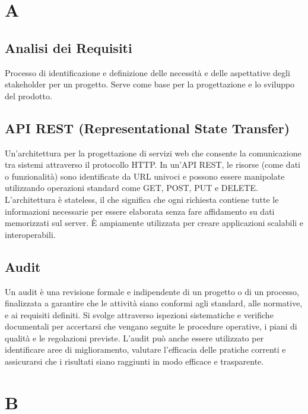 \documentclass{article}
\begin{document}


\section{A}

\subsection{Analisi dei Requisiti}
Processo di identificazione e definizione delle necessità e delle aspettative degli stakeholder per un progetto. Serve come base per la progettazione e lo sviluppo del prodotto.

\subsection{API REST (Representational State Transfer)}
Un'architettura per la progettazione di servizi web che consente la comunicazione tra sistemi attraverso il protocollo HTTP. In un'API REST, le risorse (come dati o funzionalità) sono identificate da URL univoci e possono essere manipolate utilizzando operazioni standard come GET, POST, PUT e DELETE. L'architettura è stateless, il che significa che ogni richiesta contiene tutte le informazioni necessarie per essere elaborata senza fare affidamento su dati memorizzati sul server. È ampiamente utilizzata per creare applicazioni scalabili e interoperabili.

\subsection{Audit}
Un audit è una revisione formale e indipendente di un progetto o di un processo, finalizzata a garantire che le attività siano conformi agli standard, alle normative, e ai requisiti definiti. Si svolge attraverso ispezioni sistematiche e verifiche documentali per accertarsi che vengano seguite le procedure operative, i piani di qualità e le regolazioni previste. L’audit può anche essere utilizzato per identificare aree di miglioramento, valutare l’efficacia delle pratiche correnti e assicurarsi che i risultati siano raggiunti in modo efficace e trasparente.

\newpage
\section{B}
\end{document}
